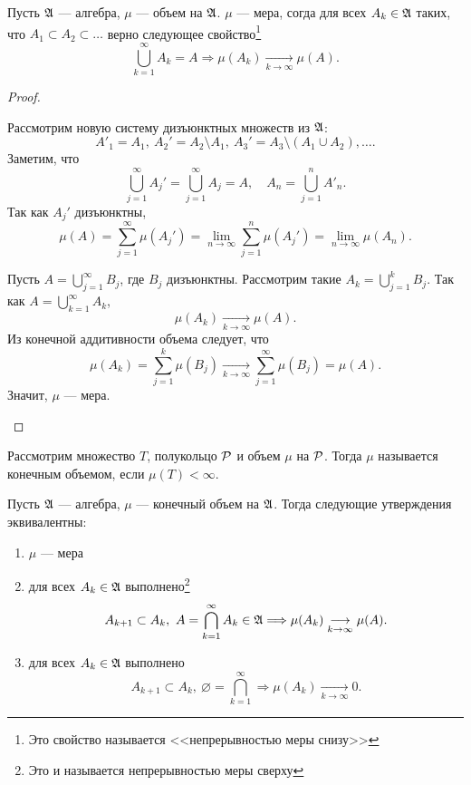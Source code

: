 \begin{thm}
    Пусть $ \A$ --- алгебра, $ \mu$ --- объем на $ \A$. $ \mu $ --- мера, согда
	для всех $ A_k \in \A$ таких, что $ A_1 \subset A_2 \subset  \ldots $ верно следующее свойство\footnote{Это свойство называется <<непрерывностью меры  снизу>>}
	\[
		\bigcup_{k=1}^{\infty} A_k = A \Longrightarrow \mu (A_k) \underset{k \to  \infty}{ \longrightarrow} \mu (A)
	.\] 
\end{thm}
\begin{proof}
    $ $
    \begin{description}
        \item {} Рассмотрим новую систему дизъюнктных множеств из $ \A$:
			 \[
				 A'_1 = A_1, ~A_2' = A_2 \setminus A_1, ~A_3' = A_3\setminus (A_1\cup A_2) , \ldots 
			.\] 
			Заметим, что
			\[
			\bigcup_{j=1}^{\infty} A_j' = \bigcup_{j=1}^{\infty} A_j = A, \quad  A_n = \bigcup_{j=1}^{n} A'_n
			.\] 
			Так как $ A_j'$ дизъюнктны, 
			\[
				\mu (A) = \sum_{j=1}^{\infty} \mu (A_j') = \lim_{n \to \infty} \sum_{j=1}^{n} \mu (A_j') = \lim_{n \to \infty} \mu (A_n)
			.\]
        \item {} 
			Пусть $ A = \bigcup\limits_{j=1}^{\infty} B_j$, где $ B_j$ дизъюнктны. Рассмотрим такие $ A_k = \bigcup\limits_{j=1}^{k} B_j$. Так как $ A =  \bigcup\limits_{k=1}^{\infty} A_k$,
			\[
				\mu (A_k) \underset{k \to  \infty}{\longrightarrow} \mu (A)
			.\] 
		Из конечной аддитивности объема следует, что
		 \[
			 \mu (A_k) = \sum_{j=1}^{k} \mu (B_j) \underset{k \to  \infty}{\longrightarrow}\sum_{j=1}^{\infty} \mu (B_j) = \mu (A)
		.\] 
		Значит, $ \mu $ --- мера.
    \end{description} 
\end{proof}
\begin{defn}
	Рассмотрим множество $ T$,  полукольцо $ \P$ и объем $ \mu $ на $ \P$. Тогда  $ \mu$ называется {\sf конечным объемом}, если  $ \mu (T) < \infty$. 
\end{defn}
\begin{thm}
	Пусть $ \A$ --- алгебра, $ \mu $ --- конечный объем на $ \A$. Тогда следующие утверждения эквивалентны:
\begin{enumerate}[label=(\roman*),noitemsep]
    \item  $ \mu $ --- мера
	\item для всех $ A_k \in \A $ выполнено\footnote{Это и называется непрерывностью меры сверху}
		\[
			A_{k+1 } \subset A_k , ~ A= \bigcap_{k=1}^{\infty} A_k \in \A \Longrightarrow \mu (A_k) \underset{k \to  \infty}{\longrightarrow} \mu (A)
		.\]  

	\item для всех $ A_k \in \A$ выполнено
		\[
			A_{k+1 } \subset A_k , ~ \varnothing= \bigcap_{k=1}^{\infty} \Longrightarrow \mu (A_k) \underset{k \to  \infty}{\longrightarrow} 0
		.\] 
\end{enumerate} 
\end{thm}
